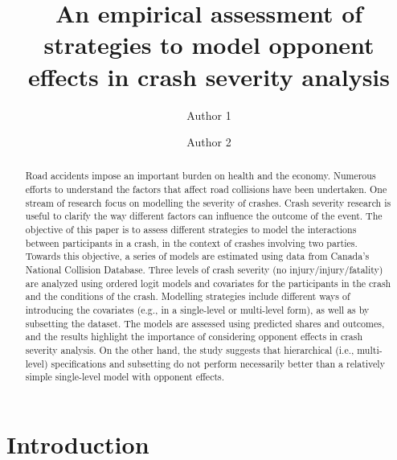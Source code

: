\documentclass[]{elsarticle} %
\begin{document}
\begin{frontmatter}

  \title{An empirical assessment of strategies to model opponent effects in crash
severity analysis}
    \author[Some University]{Author 1}
    \author[Some Institute of Technology]{Author 2}
      \address[Some University]{Department, Street, City, State, Zip}
    \address[Some Institute of Technology]{Department, Street, City, State, Zip}
    
  \begin{abstract}
  Road accidents impose an important burden on health and the economy.
  Numerous efforts to understand the factors that affect road collisions
  have been undertaken. One stream of research focus on modelling the
  severity of crashes. Crash severity research is useful to clarify the
  way different factors can influence the outcome of the event. The
  objective of this paper is to assess different strategies to model the
  interactions between participants in a crash, in the context of crashes
  involving two parties. Towards this objective, a series of models are
  estimated using data from Canada's National Collision Database. Three
  levels of crash severity (no injury/injury/fatality) are analyzed using
  ordered logit models and covariates for the participants in the crash
  and the conditions of the crash. Modelling strategies include different
  ways of introducing the covariates (e.g., in a single-level or
  multi-level form), as well as by subsetting the dataset. The models are
  assessed using predicted shares and outcomes, and the results highlight
  the importance of considering opponent effects in crash severity
  analysis. On the other hand, the study suggests that hierarchical (i.e.,
  multi-level) specifications and subsetting do not perform necessarily
  better than a relatively simple single-level model with opponent
  effects.
  \end{abstract}
  
 \end{frontmatter}

\hypertarget{introduction}{%
\section{Introduction}\label{introduction}}
\end{document}

